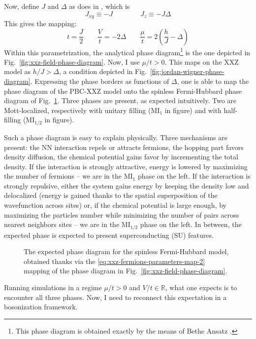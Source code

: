 %
Now, define $J$ and $\Delta$ as does \citeauthor{franchini2016integrable} in \cite[Sec.~4.1]{franchini2016integrable}, which is
\[
	J_{xy} \equiv -J
	\qquad\qquad
	J_z \equiv -J\Delta
\]
This gives the mapping:
\begin{equation}\label{eq:xxz-fermions-parameters-map-2}
	t = \frac{J}{2}
	\qquad
	\frac{V}{t} = -2\Delta
	\qquad
	\frac{\mu}{t} = 2 \left(
		\frac{h}{J} - \Delta
	\right)
\end{equation}
Within this parametrization, the analytical phase diagram\footnote{
	This phase diagram is obtained exactly by the means of Bethe Ansatz \cite{franchini2016integrable, rakov2016symmetries}.
} is the one depicted in Fig.~\ref{fig:xxz-field-phase-diagram}.
Now, I use $\mu/t > 0$. This maps on the $\mathrm{XXZ}$ model as $h/J > \Delta$, a condition depicted in Fig.~\ref{fig:jordan-wigner-phase-diagram}. Expressing the phase borders as functions of $\Delta$, one is able to map the phase diagram of the PBC-$\mathrm{XXZ}$ model onto the spinless Fermi-Hubbard phase diagram of Fig.~\ref{fig:expected-sfh-phase-diagram}. Three phases are present, as expected intuitively. Two are Mott-localized, respectively with unitary filling ($\mathrm{MI}_1$ in figure) and with half-filling ($\mathrm{MI}_{1/2}$ in figure).

Such a phase diagram is easy to explain physically. Three mechanisms are present: the NN interaction repels or attracts fermions, the hopping part favors density diffusion, the chemical potential gains favor by incrementing the total density. If the interaction is strongly attractive, energy is lowered by maximizing the number of fermions -- we are in the $\mathrm{MI}_1$ phase on the left. If the interaction is strongly repulsive, either the system gains energy by keeping the density low and delocalized (energy is gained thanks to the spatial superposition of the wavefunction across sites) or, if the chemical potential is large enough, by maximizing the particles number while minimizing the number of pairs across nearest neighbors sites -- we are in the $\mathrm{MI}_{1/2}$ phase on the left. In between, the expected phase is expected to present superconducting ($\mathrm{SU}$) features.
%
\begin{figure}
	\centering
	
	\caption{The expected phase diagram for the spinless Fermi-Hubbard model, obtained thanks via the \eqref{eq:xxz-fermions-parameters-map-2} mapping of the phase diagram in Fig.~\ref{fig:xxz-field-phase-diagram}.}
	\label{fig:expected-sfh-phase-diagram}
\end{figure}
%
Running simulations in a regime $\mu/t > 0$ and $V/t \in \mathbb{R}$, what one expects is to encounter all three phases. Now, I need to reconnect this expectation in a bosonization framework.

